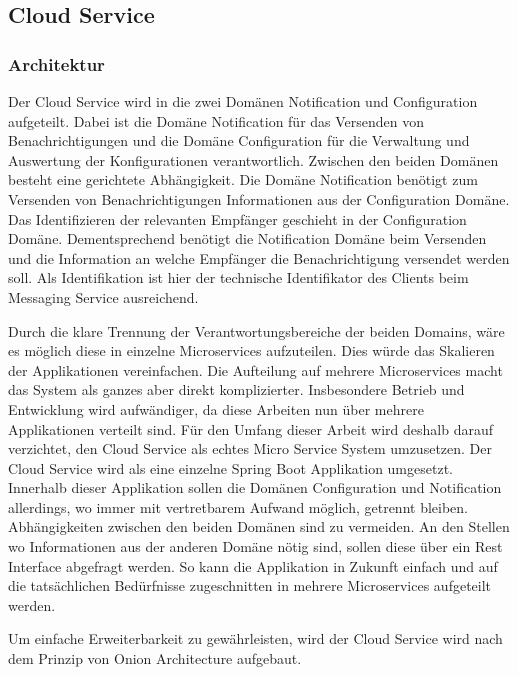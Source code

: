 
\subsection{Cloud Service}\label{subsec:cloud-service}

\subsubsection{Architektur}

Der Cloud Service wird in die zwei Domänen Notification und Configuration aufgeteilt.
Dabei ist die Domäne Notification für das Versenden von Benachrichtigungen
und die Domäne Configuration für die Verwaltung und Auswertung der Konfigurationen verantwortlich.
Zwischen den beiden Domänen besteht eine gerichtete Abhängigkeit.
Die Domäne Notification benötigt zum Versenden von Benachrichtigungen Informationen aus der Configuration Domäne.
Das Identifizieren der relevanten Empfänger geschieht in der Configuration Domäne.
Dementsprechend benötigt die Notification Domäne beim Versenden und die Information an welche Empfänger die Benachrichtigung versendet werden soll.
Als Identifikation ist hier der technische Identifikator des Clients beim Messaging Service ausreichend.

Durch die klare Trennung der Verantwortungsbereiche der beiden Domains, wäre es möglich diese in einzelne Microservices aufzuteilen.
Dies würde das Skalieren der Applikationen vereinfachen.
Die Aufteilung auf mehrere Microservices macht das System als ganzes aber direkt komplizierter.
Insbesondere Betrieb und Entwicklung wird aufwändiger, da diese Arbeiten nun über mehrere Applikationen verteilt sind.
Für den Umfang dieser Arbeit wird deshalb darauf verzichtet, den Cloud Service als echtes Micro Service System umzusetzen.
Der Cloud Service wird als eine einzelne Spring Boot Applikation umgesetzt.
Innerhalb dieser Applikation sollen die Domänen Configuration und Notification allerdings, wo immer mit vertretbarem Aufwand möglich, getrennt bleiben.
Abhängigkeiten zwischen den beiden Domänen sind zu vermeiden.
An den Stellen wo Informationen aus der anderen Domäne nötig sind, sollen diese über ein Rest Interface abgefragt werden.
So kann die Applikation in Zukunft einfach und auf die tatsächlichen Bedürfnisse zugeschnitten in mehrere Microservices aufgeteilt werden.

Um einfache Erweiterbarkeit zu gewährleisten, wird der Cloud Service wird nach dem Prinzip von Onion Architecture aufgebaut.

